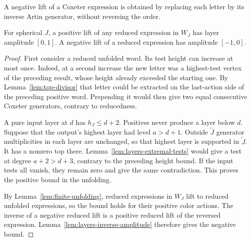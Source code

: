 A negative lift of a Coxeter expression is obtained by replacing each
letter by its inverse Artin generator, without reversing the order.

\begin{corollary}
\label{cor:reduced-amplitude}
For spherical $J$, a positive lift of any reduced expression in
$W_J$ has layer amplitude $[0,1]$.  A negative lift of a reduced
expression has amplitude $[-1,0]$.
\end{corollary}

\begin{proof}
First consider a reduced unfolded word.  Its test height can
increase at most once.  Indeed, at a second increase the new
letter was a highest-test vertex of the preceding result, whose
height already exceeded the starting one.  By
Lemma~\ref{lem:top-divisor} that letter could be extracted on
the last-action side of the preceding positive word.  Prepending
it would then give two equal consecutive Coxeter generators,
contrary to reducedness.

A pure input layer at $d$ has $h_J\leq d+2$.  Positives never
produce a layer below $d$.  Suppose that the output's highest
layer had level $a>d+1$.  Outside $\widetilde J$ generator
multiplicities in each layer are unchanged, so that highest
layer is supported in $\widetilde J$.  It has a nonzero top
there.  Lemma~\ref{lem:layers-extremal-tests} would give a test
at degree $a+2>d+3$, contrary to the preceding height bound.
If the input tests all vanish, they remain zero and give the
same contradiction.  This proves the positive bound in the
unfolding.

By Lemma~\ref{lem:finite-unfolding}, reduced expressions in
$W_J$ lift to reduced unfolded expressions, so the bound holds
for their positive color actions.  The inverse of a negative
reduced lift is a positive reduced lift of the reversed
expression.  Lemma~\ref{lem:layers-inverse-amplitude} therefore
gives the negative bound.
\end{proof}

